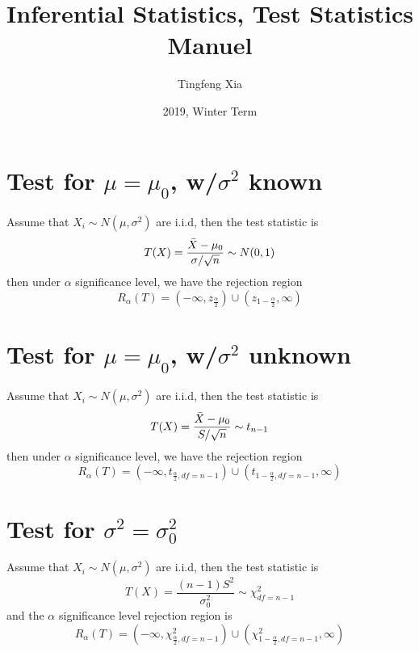 \documentclass{article}
\title{Inferential Statistics, Test Statistics Manuel}
\author{Tingfeng Xia}
\date{2019, Winter Term}
\begin{document}
\maketitle
\tableofcontents
\section{Test for $\mu = \mu_0$, w/$\sigma^2$ known}
Assume that $X_i\sim N(\mu, \sigma^2)$ are i.i.d, then the test 
statistic is
\begin{equation*}
    T(X) = \frac{\Bar{X} - \mu_0}{\sigma / \sqrt{n}} \sim N(0, 1)
\end{equation*}
then under $\alpha$ significance level, we have the rejection region
\begin{equation*}
    R_\alpha(T) = ( -\infty, z_{\frac{\alpha}{2}} ) \cup 
(z_{1-\frac{\alpha}{2}}, \infty )
\end{equation*}

\section{Test for $\mu = \mu_0$, w/$\sigma^2$ unknown}
Assume that $X_i\sim N(\mu, \sigma^2)$ are i.i.d, then the test 
statistic is
\begin{equation*}
    T(X) = \frac{\Bar{X} - \mu_0}{S / \sqrt{n}} \sim t_{n-1}
\end{equation*}
then under $\alpha$ significance level, we have the rejection region
\begin{equation*}
    R_\alpha(T) = ( -\infty, t_{\frac{\alpha}{2}, df=n-1} ) \cup 
(t_{1-\frac{\alpha}{2}, df=n-1}, \infty )
\end{equation*}

\section{Test for $\sigma^2 = \sigma_0^2$}
Assume that $X_i\sim N(\mu, \sigma^2)$ are i.i.d, then the test 
statistic is
\begin{equation*}
    T(X) = \frac{(n-1)S^2}{\sigma_0^2} \sim \chi^2_{df = n-1}
\end{equation*}
and the $\alpha$ significance level rejection region is 
\begin{equation*}
    R_\alpha(T) = ( -\infty, \chi^2_{\frac{\alpha}{2}, df=n-1} ) \cup 
(\chi^2_{1-\frac{\alpha}{2}, df=n-1}, \infty )
\end{equation*}
\end{document}
